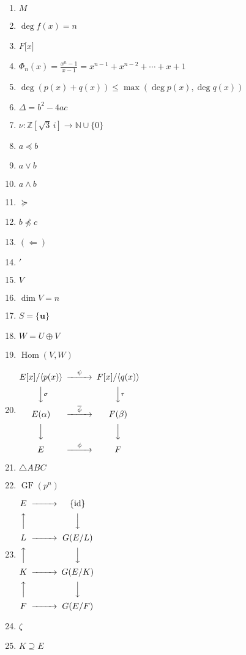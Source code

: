 \documentclass[oneside,10pt,]{article}
\newcommand{\gf}{\operatorname{GF}}
\newcommand{\Hom}{\operatorname{Hom}}
\begin{document}
\begin{enumerate}
\item{}\(M\)%
\item{}\(\deg f(x) = n\)%
\item{}\(F\lbrack x \rbrack\)%
\item{}\(\Phi_n(x) = \frac{x^n - 1}{x - 1} = x^{n - 1} + x^{n - 2} + \cdots + x + 1\)%
\item{}\(\deg( p(x) + q(x) ) \leq \max( \deg p(x), \deg q(x) )\)%
\item{}\(\Delta = b^2 - 4ac\)%
\item{}\(\nu : {\mathbb Z}[ \sqrt{3}\, i ] \rightarrow {\mathbb N} \cup \{ 0 \}\)%
\item{}\(a \preceq b\)%
\item{}\(a \vee b\)%
\item{}\(a \wedge b\)%
\item{}\(\succeq\)%
\item{}\(b \not\preceq c\)%
\item{}\(( \Leftarrow)\)%
\item{}\('\)%
\item{}\(V\)%
\item{}\(\dim V =n\)%
\item{}\(S=\{\mathbf{u}\}\)%
\item{}\(W = U \oplus V\)%
\item{}\(\Hom(V, W)\)%
\item{}\(\begin{CD}
E[x]/\langle p(x) \rangle    @>\psi>>  F[x]/\langle q(x) \rangle  \\
@VV{\sigma}V        @VV{\tau}V\\
E(\alpha)     @>\overline{\phi}>>  F(\beta) \\
@VVV        @VVV\\
E     @>\phi>>  F
\end{CD}\)%
\item{}\(\triangle ABC\)%
\item{}\(\gf(p^n)\)%
\item{}\(\begin{CD}
E   @>>>  \{\text{id}\}  \\
@AAA        @VVV\\
L     @>>>  G(E/L) \\
@AAA        @VVV\\
K    @>>>  G(E/K) \\
@AAA        @VVV\\
F    @>>>  G(E/F)
\end{CD}\)%
\item{}\(\zeta\)%
\item{}\(K \supseteq E\)%
\end{enumerate}
%
\end{document}
